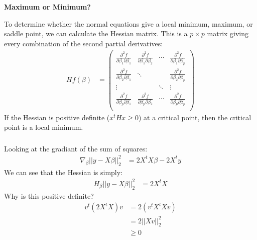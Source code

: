 \begin{frame}[fragile] \frametitle{}

{\bf Maximum or Minimum?}

To determine whether the normal equations give a local minimum, maximum, or
saddle point, we can calculate the Hessian matrix.
\pause This is a $p \times p$ matrix giving every combination of the
second partial derivatives:
\begin{align*}
H f(\beta) &=
  \left(\begin{array}{cccc}\frac{\partial^2f}{\partial \beta_1 \partial \beta_1}&\frac{\partial^2f}{\partial \beta_1 \partial \beta_2}&\cdots&\frac{\partial^2f}{\partial \beta_1 \partial \beta_p}\\
                           \frac{\partial^2f}{\partial \beta_2 \partial \beta_1}&\ddots&&\frac{\partial^2f}{\partial \beta_2 \partial \beta_p}\\
                           \vdots&&\ddots&\vdots\\
                           \frac{\partial^2f}{\partial \beta_p \partial \beta_1}&\frac{\partial^2f}{\partial \beta_p \partial \beta_2}&\cdots&\frac{\partial^2f}{\partial \beta_p \partial \beta_p}\\\end{array}\right)
\end{align*}
If the Hessian is positive definite ($x^t H x \geq 0$) at a critical point,
then the critical point is a local minimum.

\end{frame}

\begin{frame}[fragile] \frametitle{}

Looking at the gradiant of the sum of squares:
\begin{align*}
\nabla_\beta ||y - X \beta ||_2^2 &= 2 X^t X \beta - 2 X^t y
\end{align*}
\pause We can see that the Hessian is simply:
\begin{align*}
H_\beta ||y - X \beta ||_2^2 &= 2 X^t X
\end{align*}
\pause Why is this positive definite? \pause
\begin{align*}
v^t \left(2 X^tX \right) v &= 2 \left( v^t X^t X v\right) \\
&= 2 || X v ||_2^2 \\
&\geq 0
\end{align*}

\end{frame}

